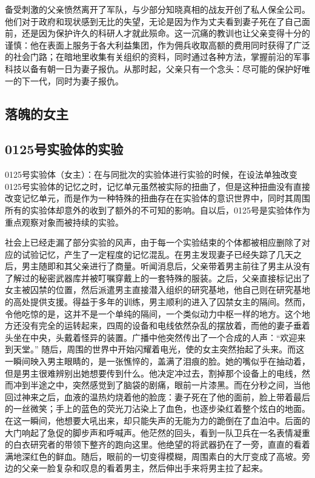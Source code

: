 \documentclass[12pt, a4paper]{article}
\begin{document}
    备受刺激的父亲愤然离开了军队，与少部分知晓真相的战友开创了私人保全公司。他们对于政府和现状感到无比的失望，无论是因为作为丈夫看到妻子死在了自己面前，还是因为保护许久的科研人才就此殒命。这一沉痛的教训也让父亲变得十分的谨慎：他在表面上服务于各大利益集团，作为佣兵收取高额的费用同时获得了广泛的社会门路；在暗地里收集有关组织的资料，同时通过各种方法，掌握前沿的军事科技以备有朝一日为妻子报仇。从那时起，父亲只有一个念头：尽可能的保护好唯一的下一代，同时为妻子报仇。

    \subsection*{落魄的女主}

    \subsection*{0125号实验体的实验}

    0125号实验体（女主）：在与同批次的实验体进行实验的时候，在设法单独改变0125号实验体的记忆之时，记忆单元虽然被实际的扭曲了，但是这种扭曲没有直接改变记忆单元，而是作为一种特殊的扭曲存在在实验体的意识世界中，同时其周围所有的实验体却意外的收到了额外的不可知的影响。自以后，0125号是实验体作为重点观察对象而被持续的实验。

    社会上已经走漏了部分实验的风声，由于每一个实验结束的个体都被相应删除了对应的试验记忆，产生了一定程度的记忆混乱。在男主发现妻子已经失踪了几天之后，男主随即和其父亲进行了商量。听闻消息后，父亲带着男主前往了男主从没有了解过的秘密武器库并被叮嘱穿戴上的一套特殊的服装。之后，父亲直接标记出了女主被囚禁的位置，然后派遣男主直接潜入组织的研究基地，他自己则在研究基地的高处提供支援。得益于多年的训练，男主顺利的进入了囚禁女主的隔间。然而，令他吃惊的是，这并不是一个单纯的隔间，一个类似动力中枢一样的地方。这个地方还没有完全的运转起来，四周的设备和电线依然杂乱的摆放着，而他的妻子垂着头坐在中央，头戴着怪异的装置。广播中他突然传出了一个合成的人声：“欢迎来到天堂。” 随后，周围的世界中开始闪耀着电光，使的女主突然抬起了头来。而这一瞬间映入男主眼睛的，是一张憔悴的，盖满了泪痕的脸。她的嘴似乎在抽动着，但是男主很难辨别出她想要传到什么。他决定冲过去，割掉那个设备上的电线，然而冲到半途之中，突然感觉到了脑袋的剧痛，眼前一片漆黑。而在分秒之间，当他回过神来之后，血液的温热灼烧着他的脸庞：妻子死在了他的面前，脸上带着最后的一丝微笑；手上的蓝色的荧光刀沾染上了血色，也逐步染红着整个炫白的地面。在这一瞬间，他想要大吼出来，却只能失声的无能为力的跪倒在了血泊中。后面的大门响起了急促的脚步声和呼喊声。他茫然的回头，看到一队卫兵在一名表情凝重的白衣研究者的带领下整齐的跑向这里。他绝望的将武器扔在了一旁，直直的看着满地深红色的鲜血。随后，眼前的一切变得模糊，周围素白的大厅变成了高坡。旁边的父亲一脸复杂和叹息的看着男主，然后伸出手来将男主拉了起来。
    
\end{document}
